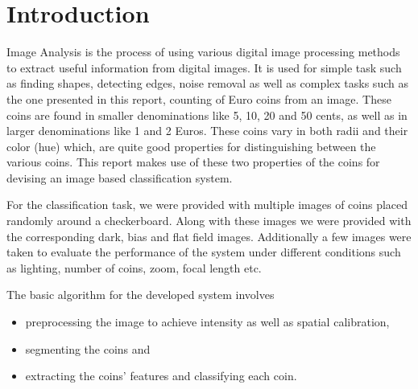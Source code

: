 \documentclass[report.tex]{subfile}
\begin{document}
\section{Introduction}

Image Analysis is the process of using various digital image processing methods
to extract useful information from digital images. It is used for simple task
such as finding shapes, detecting edges, noise removal as well as complex tasks
such as the one presented in this report, counting of Euro coins from an image.
These coins are found in smaller denominations like 5, 10, 20 and 50 cents, as
well as in larger denominations like 1 and 2 Euros. These coins vary in both
radii and their color (hue) which, are quite good properties for distinguishing
between the various coins. This report makes use of these two properties of the
coins for devising an image based classification system.

For the classification task, we were provided with multiple images of coins
placed randomly around a checkerboard. Along with these images we were provided
with the corresponding dark, bias and flat field images. Additionally a few
images were taken to evaluate the performance of the system under different
conditions such as lighting, number of coins, zoom, focal length etc.

The basic algorithm for the developed system involves
\begin{itemize}
  \item preprocessing the image to achieve intensity as well as spatial
      calibration,
  \item segmenting the coins and
  \item extracting the coins' features and classifying each coin.
\end{itemize}
\end{document}
